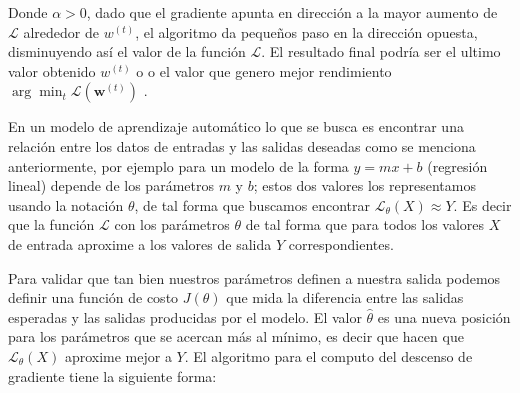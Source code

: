 Donde $ \alpha > 0$, dado que el gradiente apunta en  dirección a la mayor aumento de $\mathcal{L}$ alrededor de $w^{(t)}$, el algoritmo da pequeños paso en la dirección opuesta, disminuyendo así el valor de la función $\mathcal{L}$. El resultado final podría ser el ultimo valor obtenido $w^{(t)}$ o o el valor que genero mejor rendimiento $\arg\min_{t}\mathcal{L}(\textbf{w}^{(t)})$ \citep{gradient_des}.


En un modelo de aprendizaje automático lo que se busca es encontrar una relación entre los datos de entradas y las salidas deseadas como se menciona anteriormente, por ejemplo para un modelo de la forma $y= mx+b$ (regresión lineal) depende de los parámetros  $m$ y $b$;  estos dos valores los representamos usando la notación $\theta$, de tal forma que buscamos encontrar $\mathcal{L}_{\theta} (X) \approx Y$. Es decir que la función $\mathcal{L}$ con los parámetros $\theta$ de tal forma que para todos los valores $X$ de entrada aproxime a los valores de salida $Y$ correspondientes. 

Para validar que tan bien nuestros parámetros definen a nuestra salida podemos definir una función de costo $J(\theta)$ que mida la diferencia entre las salidas esperadas y las salidas producidas por el modelo. El valor $\hat\theta$ es una nueva posición para los parámetros que se acercan más al mínimo, es decir que hacen que $\mathcal{L}_\theta(X)$ aproxime mejor a $Y$. El algoritmo para el computo del descenso de gradiente tiene la siguiente forma:



	

